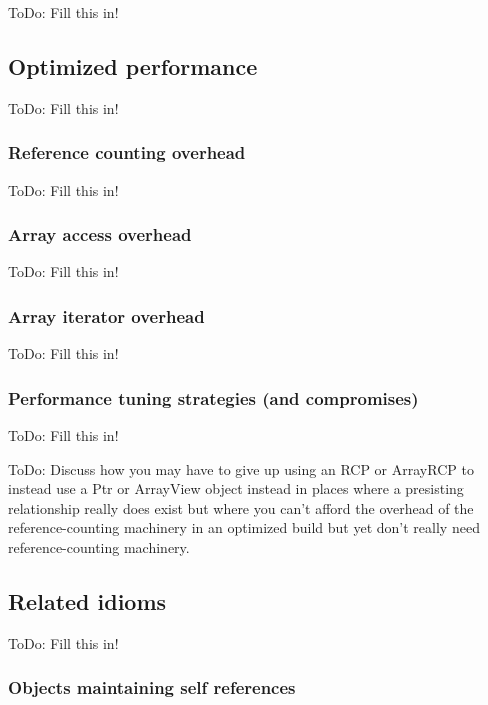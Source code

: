 \documentclass[pdf,ps2pdf,11pt]{SANDreport}
\begin{document}
ToDo: Fill this in!


%
{}\subsection{Optimized performance}
%

ToDo: Fill this in!


%
{}\subsubsection{Reference counting overhead}
\label{sec:reference-counting-overhead}
%

ToDo: Fill this in!


%
{}\subsubsection{Array access overhead}
%

ToDo: Fill this in!


%
{}\subsubsection{Array iterator overhead}
%

ToDo: Fill this in!


%
{}\subsubsection{Performance tuning strategies (and compromises)}
%

ToDo: Fill this in!

ToDo: Discuss how you may have to give up using an RCP or ArrayRCP to
instead use a Ptr or ArrayView object instead in places where a
presisting relationship really does exist but where you can't afford
the overhead of the reference-counting machinery in an optimized build
but yet don't really need reference-counting machinery.


%
{}\subsection{Related idioms}
%

ToDo: Fill this in!


%
{}\subsubsection{Objects maintaining self references}
\label{sec:self-references}
%
\end{document}
